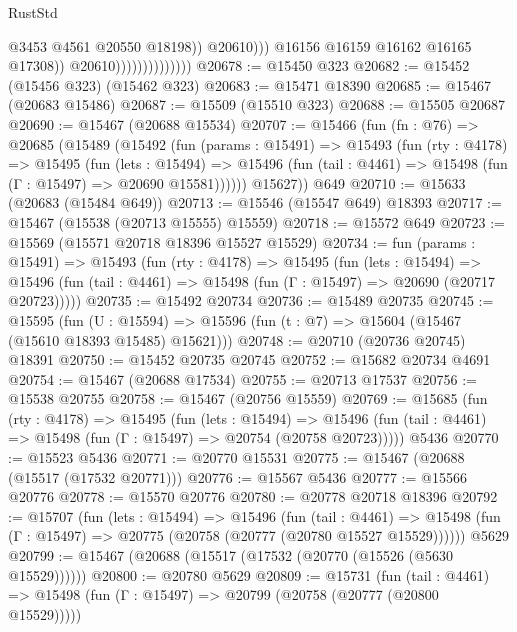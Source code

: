 \begin{lexlean}{RustStd}
\begin{coremodule}
                                              @3453
                                              @4561
                                              @20550
                                              @18198))
                                          @20610)))
                                    @16156
                                    @16159
                                    @16162
                                    @16165
                                    @17308))
                                @20610))))))))))))))
@20678 := @15450 @323
@20682 := @15452 (@15456 @323) (@15462 @323)
@20683 := @15471 @18390
@20685 := @15467 (@20683 @15486)
@20687 := @15509 (@15510 @323)
@20688 := @15505 @20687
@20690 := @15467 (@20688 @15534)
@20707 := @15466
    (fun (fn : @76) =>
    @20685
      (@15489
        (@15492
          (fun (params : @15491) =>
          @15493
            (fun (rty : @4178) =>
            @15495
              (fun (lets : @15494) =>
              @15496 (fun (tail : @4461) => @15498 (fun (Γ : @15497) => @20690 @15581))))))
        @15627))
    @649
@20710 := @15633 (@20683 (@15484 @649))
@20713 := @15546 (@15547 @649) @18393
@20717 := @15467 (@15538 (@20713 @15555) @15559)
@20718 := @15572 @649
@20723 := @15569 (@15571 @20718 @18396 @15527 @15529)
@20734 := fun (params : @15491) =>
  @15493
    (fun (rty : @4178) =>
    @15495
      (fun (lets : @15494) =>
      @15496 (fun (tail : @4461) => @15498 (fun (Γ : @15497) => @20690 (@20717 @20723)))))
@20735 := @15492 @20734
@20736 := @15489 @20735
@20745 := @15595
    (fun (U : @15594) => @15596 (fun (t : @7) => @15604 (@15467 (@15610 @18393 @15485) @15621)))
@20748 := @20710 (@20736 @20745) @18391
@20750 := @15452 @20735 @20745
@20752 := @15682 @20734 @4691
@20754 := @15467 (@20688 @17534)
@20755 := @20713 @17537
@20756 := @15538 @20755
@20758 := @15467 (@20756 @15559)
@20769 := @15685
    (fun (rty : @4178) =>
    @15495
      (fun (lets : @15494) =>
      @15496 (fun (tail : @4461) => @15498 (fun (Γ : @15497) => @20754 (@20758 @20723)))))
    @5436
@20770 := @15523 @5436
@20771 := @20770 @15531
@20775 := @15467 (@20688 (@15517 (@17532 @20771)))
@20776 := @15567 @5436
@20777 := @15566 @20776
@20778 := @15570 @20776
@20780 := @20778 @20718 @18396
@20792 := @15707
    (fun (lets : @15494) =>
    @15496
      (fun (tail : @4461) =>
      @15498 (fun (Γ : @15497) => @20775 (@20758 (@20777 (@20780 @15527 @15529))))))
    @5629
@20799 := @15467 (@20688 (@15517 (@17532 (@20770 (@15526 (@5630 @15529))))))
@20800 := @20780 @5629
@20809 := @15731
    (fun (tail : @4461) => @15498 (fun (Γ : @15497) => @20799 (@20758 (@20777 (@20800 @15529)))))

\end{coremodule}
\end{lexlean}
